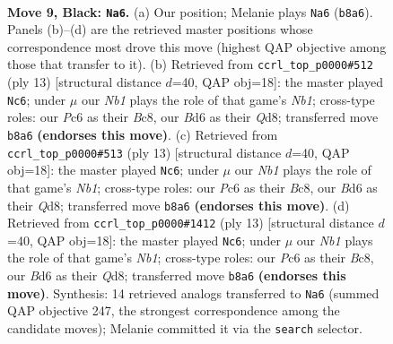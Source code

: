 \documentclass[11pt]{article}
\begin{document}
\clearpage

\begin{figure}[p]\centering
\begin{subfigure}{0.46\textwidth}\centering
\resizebox{\linewidth}{!}{%
\newchessgame
\chessboard[
  setfen={rnbq1rk1/pp4pp/2pb1n2/3p1p2/P2P3P/5NP1/1P2PPB1/RNBQ1RK1 b - - 0 9},
  showmover=false,
  pgfstyle=straightmove, color=movearrow, markmove={b8-a6}
]}
\caption{}
\end{subfigure}\hfill
\begin{subfigure}{0.46\textwidth}\centering
\resizebox{\linewidth}{!}{%
\newchessgame
\chessboard[
  setfen={rnbq1rk1/ppp1ppbp/5np1/8/2pP4/N4NP1/PP2PPBP/R1BQ1RK1 b - - 1 7},
  showmover=false,
  pgfstyle=straightmove, color=movearrow, markmove={b8-c6}
]}
\caption{}
\end{subfigure}
\\[4pt]
\begin{subfigure}{0.46\textwidth}\centering
\resizebox{\linewidth}{!}{%
\newchessgame
\chessboard[
  setfen={rnbq1rk1/ppp1ppbp/5np1/8/2pP4/N4NP1/PP2PPBP/R1BQ1RK1 b - - 1 7},
  showmover=false,
  pgfstyle=straightmove, color=movearrow, markmove={b8-c6}
]}
\caption{}
\end{subfigure}\hfill
\begin{subfigure}{0.46\textwidth}\centering
\resizebox{\linewidth}{!}{%
\newchessgame
\chessboard[
  setfen={rnbq1rk1/ppp1ppbp/5np1/8/2pP4/N4NP1/PP2PPBP/R1BQ1RK1 b - - 1 7},
  showmover=false,
  pgfstyle=straightmove, color=movearrow, markmove={b8-c6}
]}
\caption{}
\end{subfigure}
\caption{\textbf{Move 9, Black: \texttt{Na6}.} (a) Our position; Melanie plays \texttt{Na6} (\texttt{b8a6}). Panels (b)--(d) are the retrieved master positions whose correspondence most drove this move (highest QAP objective among those that transfer to it). (b) Retrieved from \texttt{ccrl\_top\_p0000\#512} (ply 13) [structural distance $d$=40, QAP obj=18]: the master played \texttt{Nc6}; under $\mu$ our \emph{Nb1} plays the role of that game's \emph{Nb1}; cross-type roles: our \emph{P}c6 as their \emph{B}c8, our \emph{B}d6 as their \emph{Q}d8; transferred move \texttt{b8a6} \textbf{(endorses this move)}. (c) Retrieved from \texttt{ccrl\_top\_p0000\#513} (ply 13) [structural distance $d$=40, QAP obj=18]: the master played \texttt{Nc6}; under $\mu$ our \emph{Nb1} plays the role of that game's \emph{Nb1}; cross-type roles: our \emph{P}c6 as their \emph{B}c8, our \emph{B}d6 as their \emph{Q}d8; transferred move \texttt{b8a6} \textbf{(endorses this move)}. (d) Retrieved from \texttt{ccrl\_top\_p0000\#1412} (ply 13) [structural distance $d$=40, QAP obj=18]: the master played \texttt{Nc6}; under $\mu$ our \emph{Nb1} plays the role of that game's \emph{Nb1}; cross-type roles: our \emph{P}c6 as their \emph{B}c8, our \emph{B}d6 as their \emph{Q}d8; transferred move \texttt{b8a6} \textbf{(endorses this move)}. Synthesis: 14 retrieved analogs transferred to \texttt{Na6} (summed QAP objective 247, the strongest correspondence among the candidate moves); Melanie committed it via the \texttt{search} selector.}
\label{fig:thought-m17}
\end{figure}
\end{document}
